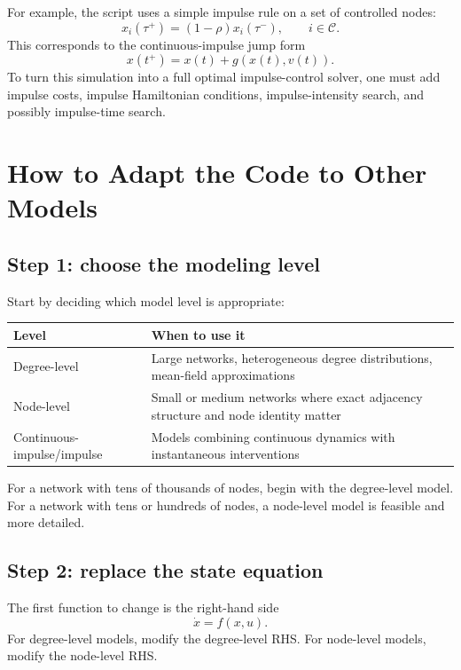 \documentclass[11pt,a4paper]{article}
\begin{document}
For example, the script uses a simple impulse rule on a set of controlled nodes:
\[
  x_i(\tau^+)=(1-\rho)x_i(\tau^-),
  \qquad i\in\mathcal{C}.
\]
This corresponds to the continuous-impulse jump form
\[
  x(t^+)=x(t)+g(x(t),v(t)).
\]
To turn this simulation into a full optimal impulse-control solver, one must add impulse costs, impulse Hamiltonian conditions, impulse-intensity search, and possibly impulse-time search.

\section{How to Adapt the Code to Other Models}

\subsection{Step 1: choose the modeling level}

Start by deciding which model level is appropriate:

\begin{center}
\begin{tabularx}{0.95\linewidth}{@{}lX@{}}
\toprule
Level & When to use it \\
\midrule
Degree-level & Large networks, heterogeneous degree distributions, mean-field approximations \\
Node-level & Small or medium networks where exact adjacency structure and node identity matter \\
Continuous-impulse/impulse & Models combining continuous dynamics with instantaneous interventions \\
\bottomrule
\end{tabularx}
\end{center}

For a network with tens of thousands of nodes, begin with the degree-level model. For a network with tens or hundreds of nodes, a node-level model is feasible and more detailed.

\subsection{Step 2: replace the state equation}

The first function to change is the right-hand side
\[
  \dot{x}=f(x,u).
\]
For degree-level models, modify the degree-level RHS. For node-level models, modify the node-level RHS.
\end{document}

